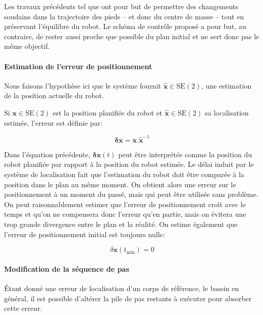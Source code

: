 Les travaux précédents tel que \cite{04harada.humanoids,
  07morisawa.icra} ont pour but de permettre des changements soudains
dans la trajectoire des pieds -- et donc du centre de masse -- tout en
préservant l'équilibre du robot. Le schéma de contrôle proposé a pour
but, au contraire, de rester aussi proche que possible du plan initial
et ne sert donc pas le même objectif.


\paragraph{Estimation de l'erreur de positionnement}

Nous faisons l'hypothèse ici que le système fournit
\mbox{$\hat{\mathbf{x}} \in \text{SE}(2)$}, une estimation de la
position actuelle du robot.

Si $\mathbf{x} \in \text{SE}(2)$ est la position planifiée du robot et
$\hat{\mathbf{x}} \in \text{SE}(2)$ sa localisation estimée, l'erreur
est définie par:

\begin{equation}\label{eq:errorpos}
  \mathbf{\delta x} = \mathbf{x} . \hat{\mathbf{x}}^{-1}
\end{equation}

Dans l'équation précédente, $\mathbf{\delta x}(t)$ peut être
interprétée comme la position du robot planifiée par rapport à la
position du robot estimée. Le délai induit par le système de
localisation fait que l'estimation du robot doit être comparée à la
position dans le plan au même moment. On obtient alors une erreur sur
le positionnement à un moment du passé, mais qui peut être utilisée
sans problème. On peut raisonnablement estimer que l'erreur de
positionnement croît avec le temps et qu'on ne compensera donc
l'erreur qu'en partie, mais on évitera une trop grande divergence
entre le plan et la réalité. On estime également que l'erreur de
positionnement initial est toujours nulle:

\begin{equation}\label{eq:errorpos_prop}
\delta \mathbf{x}(t_{\text{min}}) = 0
\end{equation}

\paragraph{Modification de la séquence de pas}

Étant donné une erreur de localisation d'un corps de référence, le
bassin en général, il est possible d'altérer la pile de pas restants à
exécuter pour absorber cette erreur.


